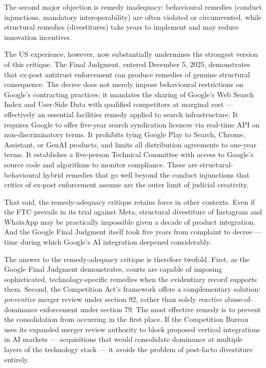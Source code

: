 The second major objection is remedy inadequacy: behavioural remedies (conduct injunctions, mandatory interoperability) are often violated or circumvented, while structural remedies (divestitures) take years to implement and may reduce innovation incentives.

The US experience, however, now substantially undermines the strongest version of this critique. The  Final Judgment, entered December 5, 2025, demonstrates that ex-post antitrust enforcement can produce remedies of genuine structural consequence. The decree does not merely impose behavioural restrictions on Google's contracting practices; it mandates the sharing of Google's Web Search Index and User-Side Data with qualified competitors at marginal cost --- effectively an essential facilities remedy applied to search infrastructure. It requires Google to offer five-year search syndication licences via real-time API on non-discriminatory terms. It prohibits tying Google Play to Search, Chrome, Assistant, or GenAI products, and limits all distribution agreements to one-year terms. It establishes a five-person Technical Committee with access to Google's source code and algorithms to monitor compliance. These are structural-behavioural hybrid remedies that go well beyond the conduct injunctions that critics of ex-post enforcement assume are the outer limit of judicial creativity.

That said, the remedy-adequacy critique retains force in other contexts. Even if the FTC prevails in its trial against Meta, structural divestiture of Instagram and WhatsApp may be practically impossible given a decade of product integration. And the Google Final Judgment itself took five years from complaint to decree --- time during which Google's AI integration deepened considerably.

The answer to the remedy-adequacy critique is therefore twofold. First, as the Google Final Judgment demonstrates, courts are capable of imposing sophisticated, technology-specific remedies when the evidentiary record supports them. Second, the Competition Act's framework offers a complementary solution: \textit{preventive} merger review under section 92, rather than solely \textit{reactive} abuse-of-dominance enforcement under section 79. The most effective remedy is to prevent the consolidation from occurring in the first place. If the Competition Bureau uses its expanded merger review authority to block proposed vertical integrations in AI markets --- acquisitions that would consolidate dominance at multiple layers of the technology stack --- it avoids the problem of post-facto divestiture entirely.

